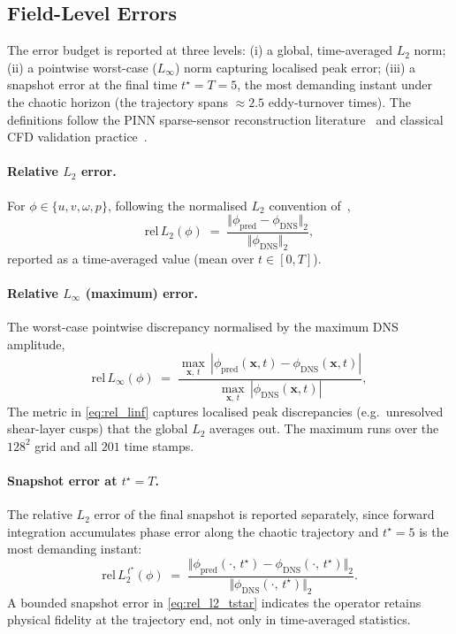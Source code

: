 \subsection{Field-Level Errors}

The error budget is reported at three levels: (i) a global, time-averaged $L_2$ norm; (ii) a pointwise worst-case ($L_\infty$) norm capturing localised peak error; (iii) a snapshot error at the final time $t^\star = T = 5$, the most demanding instant under the chaotic horizon (the trajectory spans $\approx 2.5$ eddy-turnover times). The definitions follow the PINN sparse-sensor reconstruction literature~\cite{Raissi2019JCP,Wang2024JMLR} and classical CFD validation practice~\cite{Pope2000}.

\paragraph{Relative $L_2$ error.}
For $\phi \in \{u, v, \omega, p\}$, following the normalised $L_2$ convention of~\cite{Raissi2019JCP},
\begin{equation}
    \mathrm{rel}\,L_2(\phi) \;=\; \frac{\Vert \phi_{\text{pred}} - \phi_{\text{DNS}}\Vert_2}{\Vert \phi_{\text{DNS}}\Vert_2},
\end{equation}
reported as a time-averaged value (mean over $t\in[0,T]$).

\paragraph{Relative $L_\infty$ (maximum) error.}
The worst-case pointwise discrepancy normalised by the maximum DNS amplitude,
\begin{equation}
    \label{eq:rel_linf}
    \mathrm{rel}\,L_\infty(\phi) \;=\; \frac{\max_{\mathbf{x},\,t}\,|\phi_{\text{pred}}(\mathbf{x},t) - \phi_{\text{DNS}}(\mathbf{x},t)|}{\max_{\mathbf{x},\,t}\,|\phi_{\text{DNS}}(\mathbf{x},t)|},
\end{equation}
The metric in \eqref{eq:rel_linf} captures localised peak discrepancies (e.g.\ unresolved shear-layer cusps) that the global $L_2$ averages out. The maximum runs over the $128^2$ grid and all $201$ time stamps.

\paragraph{Snapshot error at $t^\star = T$.}
The relative $L_2$ error of the final snapshot is reported separately, since forward integration accumulates phase error along the chaotic trajectory and $t^\star = 5$ is the most demanding instant:
\begin{equation}
    \label{eq:rel_l2_tstar}
    \mathrm{rel}\,L_2^{\,t^\star}(\phi) \;=\; \frac{\Vert \phi_{\text{pred}}(\cdot,\,t^\star) - \phi_{\text{DNS}}(\cdot,\,t^\star)\Vert_2}{\Vert \phi_{\text{DNS}}(\cdot,\,t^\star)\Vert_2}.
\end{equation}
A bounded snapshot error in \eqref{eq:rel_l2_tstar} indicates the operator retains physical fidelity at the trajectory end, not only in time-averaged statistics.

